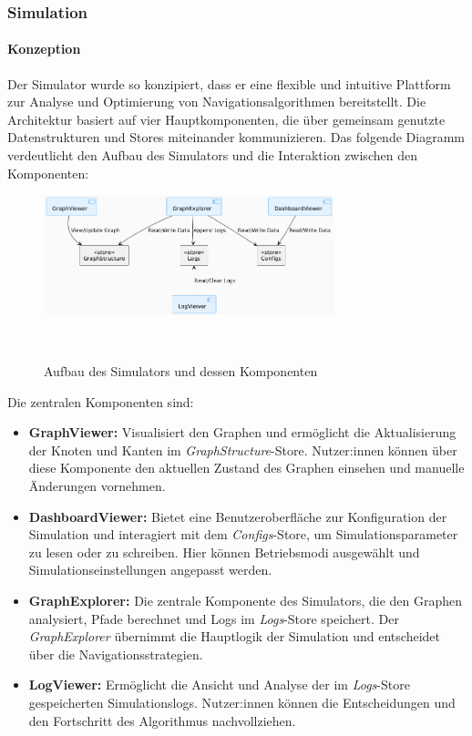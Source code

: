 \documentclass[main.tex]{subfiles} %
\begin{document}
\subsubsection{Simulation}

\paragraph{Konzeption}

Der Simulator wurde so konzipiert, dass er eine flexible und
intuitive Plattform zur Analyse und Optimierung von
Navigationsalgorithmen bereitstellt. Die Architektur basiert auf vier
Hauptkomponenten, die über gemeinsam genutzte Datenstrukturen und
Stores miteinander kommunizieren. Das folgende Diagramm verdeutlicht
den Aufbau des Simulators und die Interaktion zwischen den Komponenten:

\begin{figure}[H]
  \centering
  \includegraphics[width=0.75\textwidth]{./fig_Simulation/SimulatorKomponentenDiagramm.png}
  \caption{Aufbau des Simulators und dessen
  Komponenten}~\label{fig:SimulatorKomponentenDiagramm}
\end{figure}

Die zentralen Komponenten sind:
\begin{itemize}
  \item \textbf{GraphViewer:} Visualisiert den Graphen und ermöglicht
    die Aktualisierung der Knoten und Kanten im
    \textit{GraphStructure}-Store. Nutzer:innen können über diese
    Komponente den aktuellen Zustand des Graphen einsehen und
    manuelle Änderungen vornehmen.
  \item \textbf{DashboardViewer:} Bietet eine Benutzeroberfläche zur
    Konfiguration der Simulation und interagiert mit dem
    \textit{Configs}-Store, um Simulationsparameter zu lesen oder zu
    schreiben. Hier können Betriebsmodi ausgewählt und
    Simulationseinstellungen angepasst werden.
  \item \textbf{GraphExplorer:} Die zentrale Komponente des
    Simulators, die den Graphen analysiert, Pfade berechnet und Logs
    im \textit{Logs}-Store speichert. Der \textit{GraphExplorer}
    übernimmt die Hauptlogik der Simulation und entscheidet über die
    Navigationsstrategien.
  \item \textbf{LogViewer:} Ermöglicht die Ansicht und Analyse der im
    \textit{Logs}-Store gespeicherten Simulationslogs. Nutzer:innen
    können die Entscheidungen und den Fortschritt des Algorithmus
    nachvollziehen.
\end{itemize}
\end{document}
